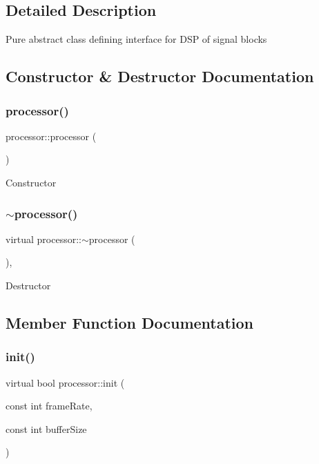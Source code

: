 \subsection{Detailed Description}
Pure abstract class defining interface for D\+SP of signal blocks 

\subsection{Constructor \& Destructor Documentation}
\mbox{\label{classprocessor_acd50a60f927d1694433455e9f00d7ff3}} 
\subsubsection{\texorpdfstring{processor()}{processor()}}
{\footnotesize\ttfamily processor\+::processor (\begin{DoxyParamCaption}{ }\end{DoxyParamCaption})\hspace{0.3cm}{\ttfamily [inline]}}

Constructor \mbox{\label{classprocessor_a1b31dd60915891a48e97a192d32919cb}} 
\subsubsection{\texorpdfstring{$\sim$processor()}{~processor()}}
{\footnotesize\ttfamily virtual processor\+::$\sim$processor (\begin{DoxyParamCaption}{ }\end{DoxyParamCaption})\hspace{0.3cm}{\ttfamily [inline]}, {\ttfamily [virtual]}}

Destructor 

\subsection{Member Function Documentation}
\mbox{\label{classprocessor_ab320bfde3ea30e74e9055a7643113922}} 
\subsubsection{\texorpdfstring{init()}{init()}}
{\footnotesize\ttfamily virtual bool processor\+::init (\begin{DoxyParamCaption}\item[{const int}]{frame\+Rate,  }\item[{const int}]{buffer\+Size }\end{DoxyParamCaption})\hspace{0.3cm}{\ttfamily [pure virtual]}}

